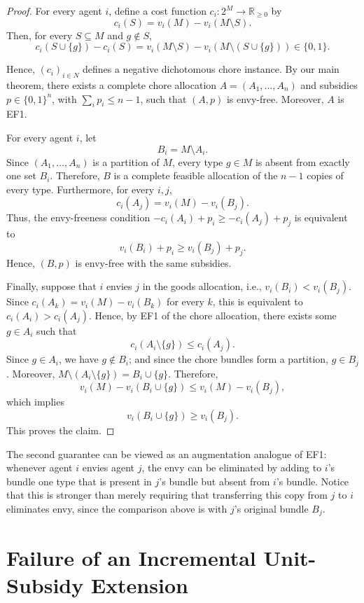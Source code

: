 \documentclass[sigconf,anonymous]{aamas}
\theoremstyle{acmplain}
\theoremstyle{acmdefinition}
\theoremstyle{acmplain}
\begin{document}
\begin{proof}
For every agent $i$, define a cost function $c_i:2^M\to\mathbb{R}_{\geq 0}$ by
$$
c_i(S)=v_i(M)-v_i(M\setminus S).
$$
Then, for every $S\subseteq M$ and $g\notin S$,
$$
c_i(S\cup\{g\})-c_i(S)
=
v_i(M\setminus S)-v_i(M\setminus(S\cup\{g\}))
\in\{0,1\}.
$$

Hence, $(c_i)_{i\in N}$ defines a negative dichotomous chore instance. By our main theorem, there exists a complete chore allocation $A=(A_1,\ldots,A_n)$ and subsidies $p\in\{0,1\}^n$, with $\sum_i p_i\leq n-1$, such that $(A,p)$ is envy-free. Moreover, $A$ is EF1.

For every agent $i$, let
$$
B_i=M\setminus A_i.
$$
Since $(A_1,\ldots,A_n)$ is a partition of $M$, every type $g\in M$ is absent from exactly one set $B_i$. Therefore, $B$ is a complete feasible allocation of the $n-1$ copies of every type. Furthermore, for every $i,j$,
$$
c_i(A_j)=v_i(M)-v_i(B_j).
$$
Thus, the envy-freeness condition $-c_i(A_i)+p_i\geq -c_i(A_j)+p_j$ is equivalent to
$$
v_i(B_i)+p_i\geq v_i(B_j)+p_j.
$$
Hence, $(B,p)$ is envy-free with the same subsidies.

Finally, suppose that $i$ envies $j$ in the goods allocation, i.e., $v_i(B_i)<v_i(B_j)$. Since $c_i(A_k)=v_i(M)-v_i(B_k)$ for every $k$, this is equivalent to $c_i(A_i)>c_i(A_j)$. Hence, by EF1 of the chore allocation, there exists some $g\in A_i$ such that
\[
c_i(A_i\setminus\{g\})\leq c_i(A_j).
\]
Since $g\in A_i$, we have $g\notin B_i$; and since the chore bundles form a partition, $g\in B_j$. Moreover, $M\setminus(A_i\setminus\{g\})=B_i\cup\{g\}$. Therefore,
$$
v_i(M)-v_i(B_i\cup\{g\})
\leq
v_i(M)-v_i(B_j),
$$
which implies
$$
v_i(B_i\cup\{g\})\geq v_i(B_j).
$$
This proves the claim.
\end{proof}

The second guarantee can be viewed as an augmentation analogue of EF1: whenever agent $i$ envies agent $j$, the envy can be eliminated by adding to $i$'s bundle one type that is present in $j$'s bundle but absent from $i$'s bundle. Notice that this is stronger than merely requiring that transferring this copy from $j$ to $i$ eliminates envy, since the comparison above is with $j$'s original bundle $B_j$.


\appendix

\section{Failure of an Incremental Unit-Subsidy Extension}
\label{sec:whynotbkns}
\end{document}
